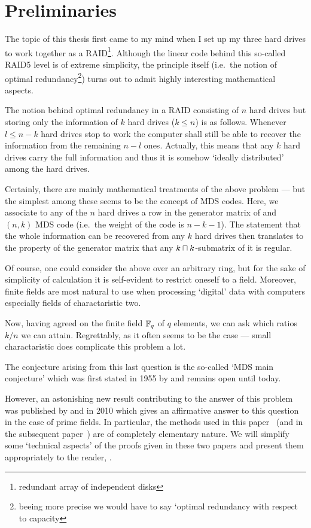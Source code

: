 \section*{Preliminaries}

The topic of this thesis first came to my mind when I set up my three hard drives to work together as a RAID\footnote{redundant array of independent disks}. Although the linear code behind this so-called RAID5 level is of extreme simplicity, the principle itself (i.e.~the notion of optimal redundancy\footnote{beeing more precise we would have to say `optimal redundancy with respect to capacity}) turns out to admit highly interesting mathematical aspects.

The notion behind optimal redundancy in a RAID consisting of $n$ hard drives but storing only the information of $k$ hard drives ($k\leq n$) is as follows. Whenever $l\leq n-k$ hard drives stop to work the computer shall still be able to recover the information from the remaining $n-l$ ones. Actually, this means that any $k$ hard drives carry the full information and thus it is somehow `ideally distributed' among the hard drives.

Certainly, there are mainly mathematical treatments of the above problem --- but the simplest among these seems to be the concept of MDS codes. Here, we associate to any of the $n$ hard drives a row in the generator matrix of and $(n,k)$ MDS code (i.e.~the  weight of the code is $n-k-1$). The statement that the whole information can be recovered from any $k$ hard drives then translates to the property of the generator matrix that any $k\setprod k$-submatrix of it is regular.

Of course, one could consider the above over an arbitrary ring, but for the sake of simplicity of calculation it is self-evident to restrict oneself to a field. Moreover, finite fields are most natural to use when processing `digital' data with computers especially fields of charactaristic two.

Now, having agreed on the finite field $\mathbb{F}_{q}$ of $q$ elements, we can ask which ratios $k/n$ we can attain. 
Regrettably, as it often seems to be the case --- small charactaristic does complicate this problem a lot.

The conjecture arising from this last question is the so-called `MDS main conjecture' which was first stated in 1955 by  and remains open until today.

However, an astonishing new result contributing to the answer of this problem was published by  and  in 2010 which gives an affirmative answer to this question in the case of prime fields. In particular, the methods used in this paper~\cite{ball2011mdsmainconjI} (and in the subsequent paper~\cite{ball2012mdsmainconjII}) are of completely elementary nature. We will simplify some `technical aspects' of the proofs given in these two papers and present them appropriately to the reader, .

